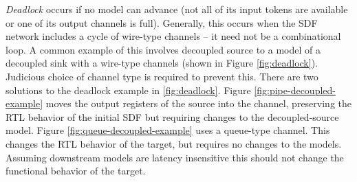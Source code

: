 \emph{Deadlock} occurs if no model can advance (not all of its input tokens are
available or one of its output channels is full). Generally, this occurs when
the SDF network includes a cycle of wire-type channels -- it need not be a
combinational loop.  A common example of this involves decoupled source to a
model of a decoupled sink with a wire-type channels (shown in Figure
\ref{fig:deadlock}). Judicious choice of channel type is required to prevent
this. There are two solutions to the deadlock example in \ref{fig:deadlock}.
Figure \ref{fig:pipe-decoupled-example} moves the output registers of the
source into the channel, preserving the RTL behavior of the initial SDF but
requiring changes to the decoupled-source model. Figure
\ref{fig:queue-decoupled-example} uses a queue-type channel. This changes the
RTL behavior of the target, but requires no changes to the models.  Assuming
downstream models are latency insensitive this should not change the functional
behavior of the target.


